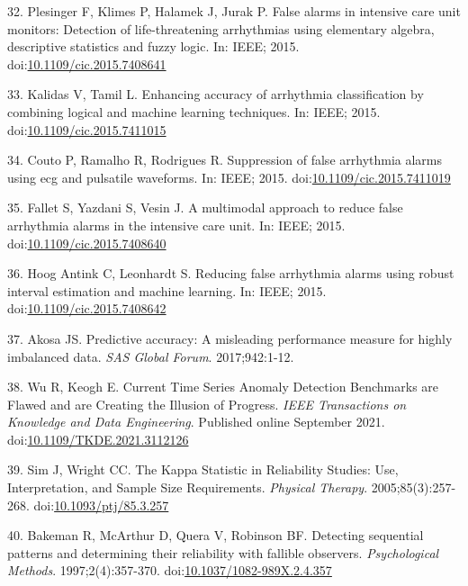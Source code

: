 \documentclass[12pt,twoside]{fmupthesis}
\begin{document}
\leavevmode\hypertarget{ref-plesinger2015}{}%
32. Plesinger F, Klimes P, Halamek J, Jurak P. False alarms in intensive care unit monitors: Detection of life-threatening arrhythmias using elementary algebra, descriptive statistics and fuzzy logic. In: IEEE; 2015. doi:\href{https://doi.org/10.1109/cic.2015.7408641}{10.1109/cic.2015.7408641}

\leavevmode\hypertarget{ref-kalidas2015}{}%
33. Kalidas V, Tamil L. Enhancing accuracy of arrhythmia classification by combining logical and machine learning techniques. In: IEEE; 2015. doi:\href{https://doi.org/10.1109/cic.2015.7411015}{10.1109/cic.2015.7411015}

\leavevmode\hypertarget{ref-couto2015}{}%
34. Couto P, Ramalho R, Rodrigues R. Suppression of false arrhythmia alarms using ecg and pulsatile waveforms. In: IEEE; 2015. doi:\href{https://doi.org/10.1109/cic.2015.7411019}{10.1109/cic.2015.7411019}

\leavevmode\hypertarget{ref-fallet2015}{}%
35. Fallet S, Yazdani S, Vesin J. A multimodal approach to reduce false arrhythmia alarms in the intensive care unit. In: IEEE; 2015. doi:\href{https://doi.org/10.1109/cic.2015.7408640}{10.1109/cic.2015.7408640}

\leavevmode\hypertarget{ref-hoogantink2015}{}%
36. Hoog Antink C, Leonhardt S. Reducing false arrhythmia alarms using robust interval estimation and machine learning. In: IEEE; 2015. doi:\href{https://doi.org/10.1109/cic.2015.7408642}{10.1109/cic.2015.7408642}

\leavevmode\hypertarget{ref-Akosa2017}{}%
37. Akosa JS. Predictive accuracy: A misleading performance measure for highly imbalanced data. \emph{SAS Global Forum}. 2017;942:1-12.

\leavevmode\hypertarget{ref-Wu2020}{}%
38. Wu R, Keogh E. Current Time Series Anomaly Detection Benchmarks are Flawed and are Creating the Illusion of Progress. \emph{IEEE Transactions on Knowledge and Data Engineering}. Published online September 2021. doi:\href{https://doi.org/10.1109/TKDE.2021.3112126}{10.1109/TKDE.2021.3112126}

\leavevmode\hypertarget{ref-Sim2005}{}%
39. Sim J, Wright CC. The Kappa Statistic in Reliability Studies: Use, Interpretation, and Sample Size Requirements. \emph{Physical Therapy}. 2005;85(3):257-268. doi:\href{https://doi.org/10.1093/ptj/85.3.257}{10.1093/ptj/85.3.257}

\leavevmode\hypertarget{ref-Bakeman1997}{}%
40. Bakeman R, McArthur D, Quera V, Robinson BF. Detecting sequential patterns and determining their reliability with fallible observers. \emph{Psychological Methods}. 1997;2(4):357-370. doi:\href{https://doi.org/10.1037/1082-989X.2.4.357}{10.1037/1082-989X.2.4.357}
\end{document}
